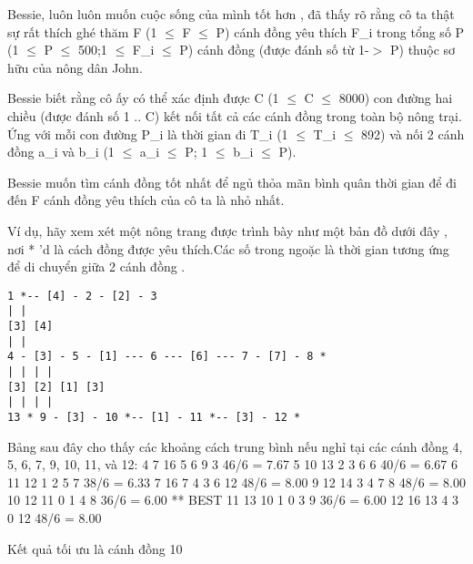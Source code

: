 Bessie, luôn luôn muốn cuộc sống của mình tốt hơn , đã thấy rõ rằng cô ta thật sự rất thích ghé thăm F (1  $\le$  F  $\le$  P) cánh đồng yêu thích F\_i trong tổng số P (1  $\le$  P  $\le$  500;1  $\le$  F\_i  $\le$  P) cánh đồng (được đánh số từ 1-$>$ P) thuộc sơ hữu của nông dân John.  

   Bessie biết rằng cô ấy có thể xác định được C (1  $\le$  C  $\le$  8000) con đường hai chiều (được đánh số 1 .. C) kết nối tất cả các cánh đồng trong toàn bộ nông trại. Ứng với mỗi con đường P\_i là thời gian đi T\_i (1  $\le$  T\_i  $\le$  892) và nối 2 cánh đồng a\_i và b\_i (1  $\le$  a\_i  $\le$  P; 1  $\le$  b\_i  $\le$  P).  

   Bessie muốn tìm cánh đồng tốt nhất để ngủ thỏa mãn bình quân thời gian để đi đến F cánh đồng yêu thích của cô ta là nhỏ nhất.  

   Ví dụ, hãy xem xét một nông trang được trình bày như một bản đồ dưới đây , nơi * 'd là cách đồng được yêu thích.Các số trong ngoặc là thời gian tương ứng để di chuyển giữa 2 cánh đồng .  
\begin{verbatim}
1 *-- [4] - 2 - [2] - 3
| |
[3] [4]
| |
4 - [3] - 5 - [1] --- 6 --- [6] --- 7 - [7] - 8 *
| | | |
[3] [2] [1] [3]
| | | |
13 * 9 - [3] - 10 *-- [1] - 11 *-- [3] - 12 *
\end{verbatim}

   Bảng sau đây cho thấy các khoảng cách trung bình nếu nghỉ tại các cánh đồng 4, 5, 6, 7, 9, 10, 11, và 12: 4 7 16 5 6 9 3 46/6 = 7.67 5 10 13 2 3 6 6 40/6 = 6.67 6 11 12 1 2 5 7 38/6 = 6.33 7 16 7 4 3 6 12 48/6 = 8.00 9 12 14 3 4 7 8 48/6 = 8.00 10 12 11 0 1 4 8 36/6 = 6.00 ** BEST 11 13 10 1 0 3 9 36/6 = 6.00 12 16 13 4 3 0 12 48/6 = 8.00  

   Kết quả tối ưu là cánh đồng 10